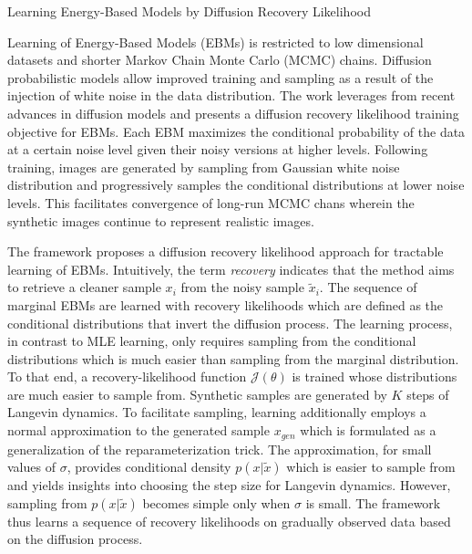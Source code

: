 \documentclass[11pt,letterpaper]{article}
\begin{document}
\begin{center}
  \large{Learning Energy-Based Models by Diffusion Recovery Likelihood}
\end{center}

Learning of Energy-Based Models (EBMs) is restricted to low dimensional datasets and shorter Markov Chain Monte Carlo (MCMC) chains. Diffusion probabilistic models allow improved training and sampling as a result of the injection of white noise in the data distribution. The work leverages from recent advances in diffusion models and presents a diffusion recovery likelihood training objective for EBMs. Each EBM maximizes the conditional probability of the data at a certain noise level given their noisy versions at higher levels. Following training, images are generated by sampling from Gaussian white noise distribution and progressively samples the conditional distributions at lower noise levels. This facilitates convergence of long-run MCMC chans wherein the synthetic images continue to represent realistic images. 

The framework proposes a diffusion recovery likelihood approach for tractable learning of EBMs. Intuitively, the term \textit{recovery} indicates that the method aims to retrieve a cleaner sample $x_{i}$ from the noisy sample $\tilde{{x}}_{i}$. The sequence of marginal EBMs are learned with recovery likelihoods which are defined as the conditional distributions that invert the diffusion process. The learning process, in contrast to MLE learning, only requires sampling from the conditional distributions which is much easier than sampling from the marginal distribution. To that end, a recovery-likelihood function $\mathcal{J}(\theta)$ is trained whose distributions are much easier to sample from. Synthetic samples are generated by $K$ steps of Langevin dynamics. To facilitate sampling, learning additionally employs a normal approximation to the generated sample $x_{gen}$ which is formulated as a generalization of the reparameterization trick. The approximation, for small values of $\sigma$, provides conditional density $p(x|\tilde{x})$ which is easier to sample from and yields insights into choosing the step size for Langevin dynamics. However, sampling from $p(x|\tilde{x})$ becomes simple only when $\sigma$ is small. The framework thus learns a sequence of recovery likelihoods on gradually observed data based on the diffusion process. 
\end{document}

